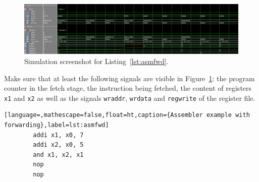 \begin{figure}[ht!]
	\includegraphics[width=1.0\linewidth]{fwd.png}
	\caption{Simulation screenshot for Listing~\ref{lst:asmfwd}.}
	\label{fig:sim1}
\end{figure}

Make sure that at least the following signals are visible in
Figure~\ref{fig:sim1}: the program counter in the fetch stage, the
instruction being fetched, the content of registers \texttt{x1} 
and \texttt{x2} as well as the signals \texttt{wraddr},
\texttt{wrdata} and \texttt{regwrite} of the register file.

\begin{lstlisting}[language=,mathescape=false,float=ht,caption={Assembler example with forwarding},label=lst:asmfwd]
        addi x1, x0, 7
        addi x2, x0, 5
        and x1, x2, x1
        nop
        nop
\end{lstlisting}

